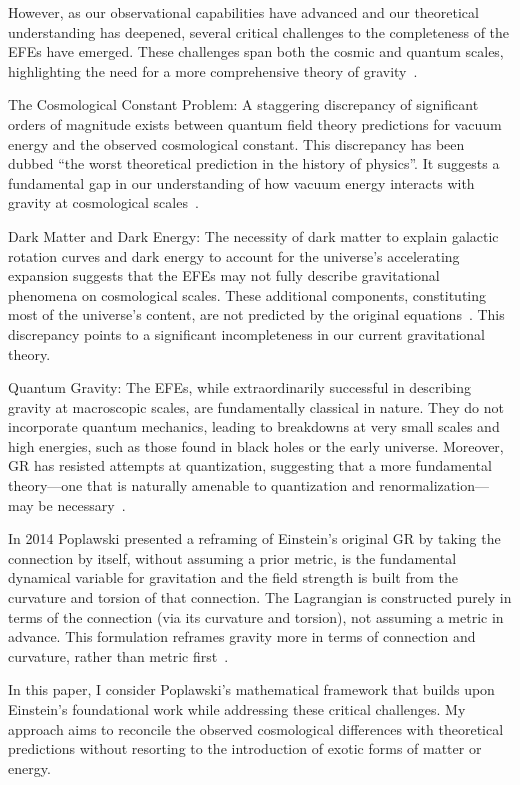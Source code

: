 \documentclass[aps,prd,preprint]{revtex4-1}
\begin{document}
However, as our observational capabilities have advanced and our theoretical understanding has deepened, several critical challenges to the completeness of the EFEs have emerged. These challenges span both the cosmic and quantum scales, highlighting the need for a more comprehensive theory of gravity~\cite{brandes_2013}.

The Cosmological Constant Problem: A staggering discrepancy of significant orders of magnitude exists between quantum field theory predictions for vacuum energy and the observed cosmological constant. This discrepancy has been dubbed ``the worst theoretical prediction in the history of physics''. It suggests a fundamental gap in our understanding of how vacuum energy interacts with gravity at cosmological scales~\cite{weinberg_1989,hobson_2006}.

Dark Matter and Dark Energy: The necessity of dark matter to explain galactic rotation curves and dark energy to account for the universe's accelerating expansion suggests that the EFEs may not fully describe gravitational phenomena on cosmological scales. These additional components, constituting most of the universe's content, are not predicted by the original equations~\cite{bertone_2018,frieman_2008}. This discrepancy points to a significant incompleteness in our current gravitational theory.

Quantum Gravity: The EFEs, while extraordinarily successful in describing gravity at macroscopic scales, are fundamentally classical in nature. They do not incorporate quantum mechanics, leading to breakdowns at very small scales and high energies, such as those found in black holes or the early universe. Moreover, GR has resisted attempts at quantization, suggesting that a more fundamental theory—one that is naturally amenable to quantization and renormalization—may be necessary~\cite{wald_1984,rovelli_2004,hawking_1973}.

In 2014 Poplawski presented a reframing of Einstein's original GR by taking the connection by itself, without assuming a prior metric, is the fundamental dynamical variable for gravitation and the field strength is built from the curvature and torsion of that connection. The Lagrangian is constructed purely in terms of the connection (via its curvature and torsion), not assuming a metric in advance. This formulation reframes gravity more in terms of connection and curvature, rather than metric first~\cite{poplawski_2014}.

In this paper, I consider Poplawski's mathematical framework that builds upon Einstein's foundational work while addressing these critical challenges. My approach aims to reconcile the observed cosmological differences with theoretical predictions without resorting to the introduction of exotic forms of matter or energy.
\end{document}
